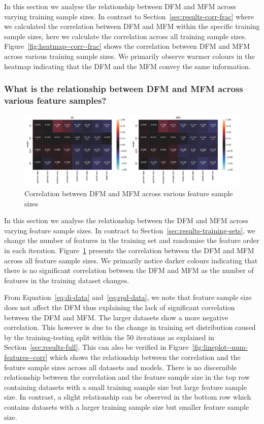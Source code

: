 \documentclass{article}
\begin{document}
In this section we analyse the relationship between DFM and MFM across
varying training sample sizes. In contrast to
Section \ref{sec:results-corr-frac} where we calculated the
correlation between DFM and MFM within the specific training sample
sizes, here we calculate the correlation across all training sample
sizes. Figure \ref{fig:heatmap--corr--frac} shows the correlation
between DFM and MFM across various training sample sizes. We primarily
observe warmer colours in the heatmap indicating that the DFM and the
MFM convey the same information.

\subsubsection{What is the relationship between DFM and MFM across various feature samples?}\label{sec:results-feature-sets}

\begin{figure}
  \centering
  \includegraphics[width=0.95\linewidth]{heatmap--corr--num-features.pdf}
  \caption{Correlation between DFM and MFM across various feature
    sample sizes}
  \label{fig:heatmap--corr--num-features}
\end{figure}

In this section we analyse the relationship between the DFM and MFM
across varying feature sample sizes. In contract to
Section \ref{sec:results-training-sets}, we change the number of
features in the training set and randomise the feature order in each
iteration. Figure \ref{fig:heatmap--corr--num-features} presents the
correlation between the DFM and MFM across all feature sample sizes.
We primarily notice darker colours indicating that there is no
significant correlation between the DFM and MFM as the number of
features in the training dataset changes.

From Equation \ref{eq:di-data} and \ref{eq:spd-data}, we note that
feature sample size does not affect the DFM thus explaining the lack
of significant correlation between the DFM and MFM. The larger
datasets show a more negative correlation. This however is due to the
change in training set distribution caused by the training-testing
split within the 50 iterations as explained
in Section \ref{sec:results-full}. This can also be verified in
Figure \ref{fig:lineplot--num-features--corr} which shows the
relationship between the correlation and the feature sample sizes
across all datasets and models. There is no discernible relationship
between the correlation and the feature sample size in the top row
containing datasets with a small training sample size but large
feature sample size. In contrast, a slight relationship can be observed
in the bottom row which contains datasets with a larger training
sample size but smaller feature sample size.
\end{document}
